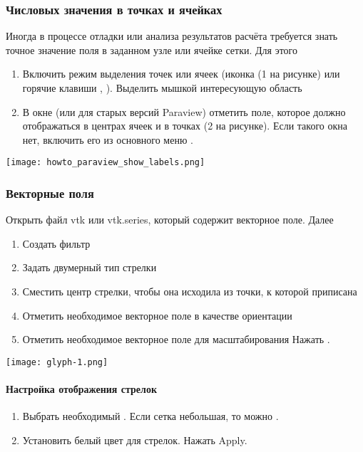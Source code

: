 \subsubsection{Числовых значения в точках и ячейках}
\label{sec:paraview-show-data}

Иногда в процессе отладки или анализа результатов расчёта
требуется знать точное значение поля в заданном узле или ячейке сетки.
Для этого

\begin{enumerate}
\item Включить режим выделения точек или ячеек (иконка (1 на рисунке) или горячие клавиши , ).
      Выделить мышкой интересующую область
\item В окне  (или  для старых версий Paraview) отметить поле, которое должно отображаться 
      в центрах ячеек и в точках (2 на рисунке). Если такого окна нет, включить его из основного меню .
\end{enumerate}

\begin{center}
\texttt{[image: howto\_paraview\_show\_labels.png]}
\end{center}

\subsubsection{Векторные поля}
\label{sec:paraview-glyph}

Открыть файл vtk или vtk.series, который содержит
векторное поле. Далее
\begin{enumerate}
\item Создать фильтр 
\item Задать двумерный тип стрелки
\item Сместить центр стрелки, чтобы она исходила из точки, к которой приписана
\item Отметить необходимое векторное поле в качестве ориентации
\item Отметить необходимое векторное поле для масштабирования
      Нажать .
\end{enumerate}

\begin{center}
\texttt{[image: glyph-1.png]}
\end{center}

\paragraph{Настройка отображения стрелок}
\begin{enumerate}
\item Выбрать необходимый . Если сетка небольшая, то можно .
\item Установить белый цвет для стрелок. Нажать Apply.
\end{enumerate}

